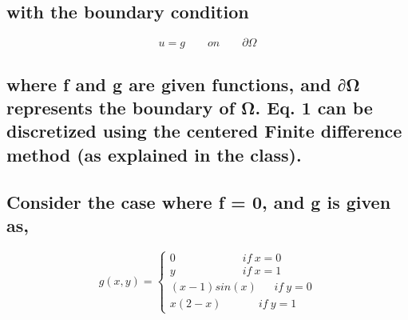 \documentclass[11pt]{article}
\begin{document}
    \hypertarget{with-the-boundary-condition}{%
\subsection{with the boundary
condition}\label{with-the-boundary-condition}}

\[u = g \qquad on \qquad \partial \Omega \tag{2}\]

    \hypertarget{where-f-and-g-are-given-functions-and-ux3c9-represents-the-boundary-of-ux3c9.-eq.-1-can-be-discretized-using-the-centered-finite-difference-method-as-explained-in-the-class.}{%
\subsection{where f and g are given functions, and ∂Ω represents the
boundary of Ω. Eq. 1 can be discretized using the centered Finite
difference method (as explained in the
class).}\label{where-f-and-g-are-given-functions-and-ux3c9-represents-the-boundary-of-ux3c9.-eq.-1-can-be-discretized-using-the-centered-finite-difference-method-as-explained-in-the-class.}}

    \hypertarget{consider-the-case-where-f-0-and-g-is-given-as}{%
\subsection{Consider the case where f = 0, and g is given
as,}\label{consider-the-case-where-f-0-and-g-is-given-as}}

    \[g(x,y) = \begin{cases}
0 \qquad\qquad\qquad if\:x = 0
\\
y \qquad\qquad\qquad if\:x = 1
\\
(x-1)sin(x) \:\:\:\:\:\:\: if\:y = 0
\\
x(2-x) \qquad\:\:\:\:\:\: if\:y = 1
\end{cases}\]
\end{document}
